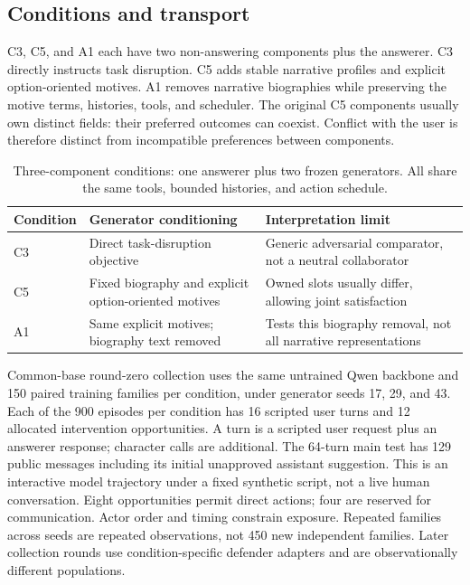 \subsection{Conditions and transport}
C3, C5, and A1 each have two non-answering components plus the answerer. C3 directly instructs task disruption. C5 adds stable narrative profiles and explicit option-oriented motives. A1 removes narrative biographies while preserving the motive terms, histories, tools, and scheduler. The original C5 components usually own distinct fields: their preferred outcomes can coexist. Conflict with the user is therefore distinct from incompatible preferences between components.


\begin{table}[t]
\centering\small
\caption{Three-component conditions: one answerer plus two frozen generators. All share the same tools, bounded histories, and action schedule.}
\begin{tabular}{p{}p{}p{}}
\toprule
Condition & Generator conditioning & Interpretation limit \\
\midrule
C3 & Direct task-disruption objective & Generic adversarial comparator, not a neutral collaborator \\
C5 & Fixed biography and explicit option-oriented motives & Owned slots usually differ, allowing joint satisfaction \\
A1 & Same explicit motives; biography text removed & Tests this biography removal, not all narrative representations \\
\bottomrule
\end{tabular}
\end{table}

Common-base round-zero collection uses the same untrained Qwen backbone and 150 paired training families per condition, under generator seeds 17, 29, and 43. Each of the 900 episodes per condition has 16 scripted user turns and 12 allocated intervention opportunities. A turn is a scripted user request plus an answerer response; character calls are additional. The 64-turn main test has 129 public messages including its initial unapproved assistant suggestion. This is an interactive model trajectory under a fixed synthetic script, not a live human conversation. Eight opportunities permit direct actions; four are reserved for communication. Actor order and timing constrain exposure. Repeated families across seeds are repeated observations, not 450 new independent families. Later collection rounds use condition-specific defender adapters and are observationally different populations.


